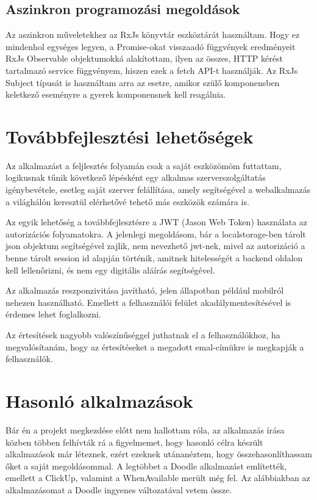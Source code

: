 \documentclass[a4paper,12pt]{report}
\theoremstyle{definition}
\theoremstyle{remark}
\begin{document}
\section{Aszinkron programozási megoldások}

Az aszinkron műveletekhez az RxJs könyvtár eszköztárát használtam. Hogy ez mindenhol egységes legyen, a Promise-okat visszaadó függvények eredményeit RxJs Observable objektumokká alakítottam, ilyen az összes, HTTP kérést tartalmazó service függvényem, hiszen ezek a fetch API-t használják. Az RxJs Subject típusát is használtam arra az esetre, amikor szülő komponensben keletkező eseményre a gyerek komponensnek kell reagálnia.
 
\chapter{Továbbfejlesztési lehetőségek}

Az alkalmazást a feljlesztés folyamán csak a saját eszközömöm futtattam, logikusnak tűnik következő lépésként egy alkalmas szerverszolgáltatás igénybevétele, esetleg saját szerver felállítása, amely segítségével a webalkalmazás a világhálón keresztül elérhetővé tehető más eszközök számára is.

Az egyik lehetőség a továbbfejlesztésre a JWT (Jason Web Token) használata az autorizációs folyamatokra. A jelenlegi megoldásom, bár a localstorage-ben tárolt json objektum segítségével zajlik, nem nevezhető jwt-nek, mivel az autorizáció a benne tárolt session id alapján történik, amitnek hitelességét a backend oldalon kell lellenőrizni, és nem egy digitális aláírás segítségével.

Az alkalmazás reszponzivitása javítható, jelen állapotban például mobilról nehezen használható. Emellett a felhasználói felület akadálymentesítésével is érdemes lehet foglalkozni.

Az értesítések nagyobb valószínűséggel juthatnak el a felhasználókhoz, ha megvalósítanám, hogy az értesítéseket a megadott emal-címükre is megkapják a felhasználók.

\chapter{Hasonló alkalmazások}

Bár én a projekt megkezdése előtt nem hallottam róla, az alkalmazás írása közben többen felhívták rá a figyelmemet, hogy hasonló célra készült alkalmazások már léteznek, ezért ezeknek utánanéztem, hogy összehasonlíthassam őket a saját megoldásommal. A legtöbbet a Doodle alkalmazást említették, emellett a ClickUp, valamint a WhenAvailable merült még fel. Az alábbiakban az alkalmazásomat a Doodle ingyenes változatával vetem össze.
\end{document}
